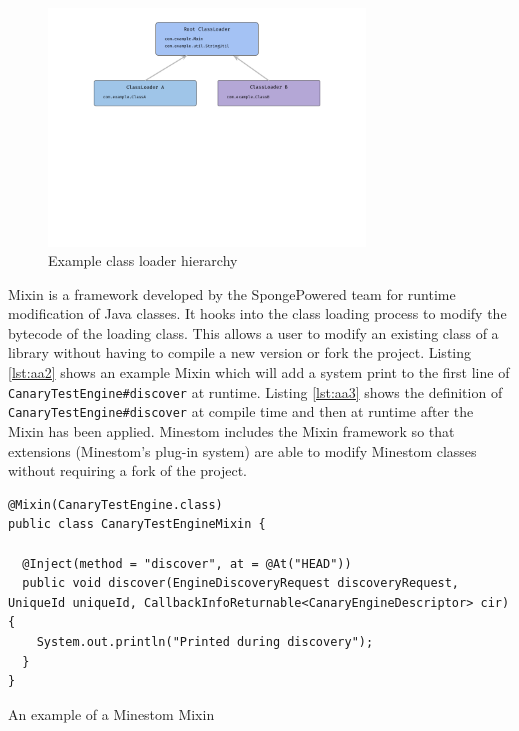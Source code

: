\documentclass[12pt]{article}
\def\code#1{\texttt{#1}}
\begin{document}
\begin{onehalfspacing}
\begin{figure}[H] 
    \centering
    \includegraphics[width=0.75\textwidth]{media/media/image1.png} 
    \caption{Example class loader hierarchy} 
    \label{fig:aa1}  
\end{figure}


Mixin is a framework developed by the SpongePowered team for runtime
modification of Java classes. It hooks into the class loading process to
modify the bytecode of the loading class. This allows a user to modify
an existing class of a library without having to compile a new version
or fork the project. Listing \ref{lst:aa2} shows an example Mixin which will add
a system print to the first line of \code{CanaryTestEngine\#discover} at
runtime. Listing \ref{lst:aa3} shows the definition of
\code{CanaryTestEngine\#discover} at compile time and then at runtime after
the Mixin has been applied. Minestom includes the Mixin framework so
that extensions (Minestom's plug-in system) are able to modify Minestom
classes without requiring a fork of the project.

\begin{listing}[H]
\begin{verbatim}
@Mixin(CanaryTestEngine.class)
public class CanaryTestEngineMixin {

  @Inject(method = "discover", at = @At("HEAD"))
  public void discover(EngineDiscoveryRequest discoveryRequest, UniqueId uniqueId, CallbackInfoReturnable<CanaryEngineDescriptor> cir) {
    System.out.println("Printed during discovery");
  }
}
\end{verbatim}
\caption{An example of a Minestom Mixin}
\label{lst:aa2}
\end{listing}


\end{onehalfspacing}
\end{document}
